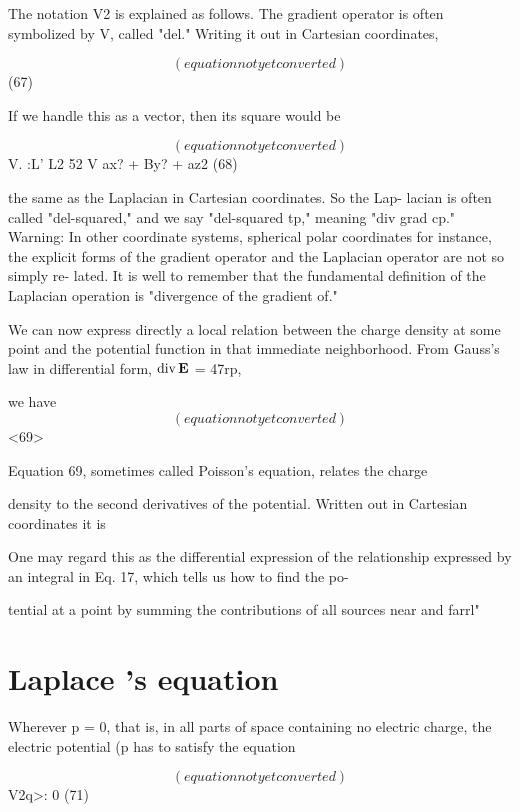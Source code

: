 The notation V2 is explained as follows. The gradient operator is
often symbolized by V, called "del." Writing it out in Cartesian
coordinates,

\begin{equation}
(equation not yet converted)
\end{equation}
(67)

If we handle this as a vector, then its square would be

\begin{equation}
(equation not yet converted)
\end{equation}
V. :L' L2 52
V ax? + By? + az2 (68)

the same as the Laplacian in Cartesian coordinates. So the Lap-
lacian is often called "del-squared," and we say "del-squared tp,"
meaning "div grad cp." Warning: In other coordinate systems,
spherical polar coordinates for instance, the explicit forms of the
gradient operator and the Laplacian operator are not so simply re-
lated. It is well to remember that the fundamental definition of the
Laplacian operation is "divergence of the gradient of."

We can now express directly a local relation between the charge
density at some point and the potential function in that immediate
neighborhood. From Gauss's law in differential form, $\operatorname{div}\mathbf{E}$ = 47rp,

we have
\begin{equation}
(equation not yet converted)
\end{equation}
<69>

Equation 69, sometimes called Poisson's equation, relates the charge

density to the second derivatives of the potential. Written out in
Cartesian coordinates it is

One may regard this as the differential expression of the relationship
expressed by an integral in Eq. 17, which tells us how to find the po-

tential at a point by summing the contributions of all sources near
and farrl"

\section{Laplace 's equation}

Wherever p = 0, that is, in all parts of space containing no electric
charge, the electric potential (p has to satisfy the equation

\begin{equation}
(equation not yet converted)
\end{equation}
V2q>: 0 (71)

